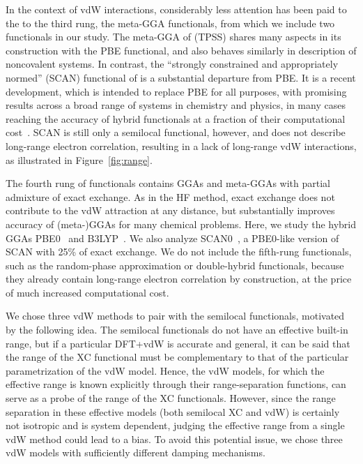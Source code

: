 In the context of vdW interactions, considerably less attention has been paid to the to the third rung, the meta-GGA functionals, from which we include two functionals in our study.
The meta-GGA of \citet*{TaoPRL03} (TPSS) shares many aspects in its construction with the PBE functional, and also behaves similarly in description of noncovalent systems.
In contrast, the ``strongly constrained and appropriately normed'' (SCAN) functional of \citet{SunPRL15} is a substantial departure from PBE\@.
It is a recent development, which is intended to replace PBE for all purposes, with promising results across a broad range of systems in chemistry and physics, in many cases reaching the accuracy of hybrid functionals at a fraction of their computational cost~\cite{SunNC16}.
SCAN is still only a semilocal functional, however, and does not describe long-range electron correlation, resulting in a lack of long-range vdW interactions, as illustrated in Figure~\ref{fig:range}.

The fourth rung of functionals contains GGAs and meta-GGAs with partial admixture of exact exchange.
As in the HF method, exact exchange does not contribute to the vdW attraction at any distance, but substantially improves accuracy of (meta-)GGAs for many chemical problems. %
Here, we study the hybrid GGAs PBE0~\cite{PerdewJCP96,AdamoJCP99} and B3LYP~\cite{BeckeJCP93}.
We also analyze SCAN0~\cite{HuiJCP16}, a PBE0-like version of SCAN with 25\% of exact exchange.
We do not include the fifth-rung functionals, such as the random-phase approximation or double-hybrid functionals, because they already contain long-range electron correlation by construction, at the price of much increased computational cost.

We chose three vdW methods to pair with the semilocal functionals, motivated by the following idea.
The semilocal functionals do not have an effective built-in range, but if a particular DFT+vdW is accurate and general, it can be said that the range of the XC functional must be complementary to that of the particular parametrization of the vdW model.
Hence, the vdW models, for which the effective range is known explicitly through their range-separation functions, can serve as a probe of the range of the XC functionals.
However, since the range separation in these effective models (both semilocal XC and vdW) is certainly not isotropic and is system dependent, judging the effective range from a single vdW method could lead to a bias.
To avoid this potential issue, we chose three vdW models with sufficiently different damping mechanisms.

